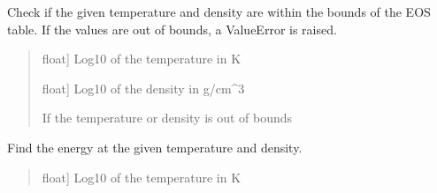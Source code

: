 \documentclass[letterpaper,10pt,english]{sphinxmanual}
\begin{document}
\begin{fulllineitems}
\begin{fulllineitems}
\label{\detokenize{CoolDwarf.EOS.ChabrierDebras2021:CoolDwarf.EOS.ChabrierDebras2021.EOS.CH21EOS.check_forward_params}}
\pysigstartsignatures
{}
\pysigstopsignatures
\sphinxAtStartPar
Check if the given temperature and density are within the bounds of the EOS table. If the values are out of
bounds, a ValueError is raised.
\begin{quote}\begin{description}
\begin{description}
\sphinxlineitem{\sphinxstylestrong{logT}}{[}float{]}
\sphinxAtStartPar
Log10 of the temperature in K

\sphinxlineitem{\sphinxstylestrong{logRho}}{[}float{]}
\sphinxAtStartPar
Log10 of the density in g/cm\textasciicircum{}3

\end{description}

\begin{description}
\sphinxAtStartPar
If the temperature or density is out of bounds

\end{description}

\end{description}\end{quote}

\end{fulllineitems}


\begin{fulllineitems}
\label{\detokenize{CoolDwarf.EOS.ChabrierDebras2021:CoolDwarf.EOS.ChabrierDebras2021.EOS.CH21EOS.energy}}
\pysigstartsignatures
{}
\pysigstopsignatures
\sphinxAtStartPar
Find the energy at the given temperature and density.
\begin{quote}\begin{description}
\begin{description}
\sphinxlineitem{\sphinxstylestrong{logT}}{[}float{]}
\sphinxAtStartPar
Log10 of the temperature in K


\end{description}
\end{description}
\end{quote}
\end{fulllineitems}
\end{fulllineitems}
\end{document}
